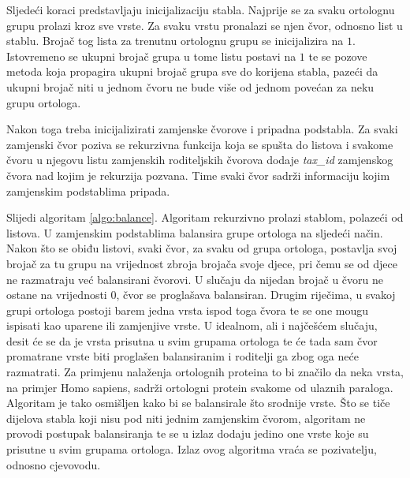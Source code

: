Sljedeći koraci predstavljaju inicijalizaciju stabla. Najprije se za svaku
ortolognu grupu prolazi kroz sve vrste. Za svaku vrstu pronalazi se njen čvor,
odnosno list u stablu. Brojač tog lista za trenutnu ortolognu grupu se
inicijalizira na $1$. Istovremeno se ukupni brojač grupa u tome listu postavi na
$1$ te se pozove metoda koja propagira ukupni brojač grupa sve do korijena
stabla, pazeći da ukupni brojač niti u jednom čvoru ne bude više od jednom
povećan za neku grupu ortologa.

Nakon toga treba inicijalizirati zamjenske čvorove i pripadna podstabla. Za
svaki zamjenski čvor poziva se rekurzivna funkcija koja se spušta do listova i
svakome čvoru u njegovu listu zamjenskih roditeljskih čvorova dodaje
\emph{tax\_id} zamjenskog čvora nad kojim je rekurzija pozvana.  Time svaki čvor
sadrži informaciju kojim zamjenskim podstablima pripada.



Slijedi algoritam \ref{algo:balance}. Algoritam rekurzivno prolazi stablom,
polazeći od listova. U zamjenskim podstablima balansira grupe ortologa na
sljedeći način. Nakon što se obiđu listovi, svaki čvor, za svaku od grupa
ortologa, postavlja svoj brojač za tu grupu na vrijednost zbroja brojača svoje
djece, pri čemu se od djece ne razmatraju već balansirani čvorovi. U slučaju da
nijedan brojač u čvoru ne ostane na vrijednosti $0$, čvor se proglašava
balansiran. Drugim riječima, u svakoj grupi ortologa postoji barem jedna vrsta
ispod toga čvora te se one mougu ispisati kao uparene ili zamjenjive vrste.  U
idealnom, ali i najčešćem slučaju, desit će se da je vrsta prisutna u svim
grupama ortologa te će tada sam čvor promatrane vrste biti proglašen
balansiranim i roditelji ga zbog oga neće razmatrati. Za primjenu nalaženja
ortolognih proteina to bi značilo da neka vrsta, na primjer Homo sapiens, sadrži
ortologni protein svakome od ulaznih paraloga. Algoritam je tako osmišljen kako
bi se balansirale što srodnije vrste.  Što se tiče dijelova stabla koji nisu pod
niti jednim zamjenskim čvorom, algoritam ne provodi postupak balansiranja te se
u izlaz dodaju jedino one vrste koje su prisutne u svim grupama ortologa. Izlaz
ovog algoritma vraća se pozivatelju, odnosno cjevovodu.


